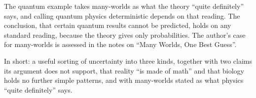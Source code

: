 \begin{afterword}
The quantum example takes many-worlds as what the theory ``quite definitely'' says, and calling quantum physics deterministic depends on that reading. The conclusion, that certain quantum results cannot be predicted, holds on any standard reading, because the theory gives only probabilities. The author's case for many-worlds is assessed in the notes on ``Many Worlds, One Best Guess''.

In short: a useful sorting of uncertainty into three kinds, together with two claims its argument does not support, that reality ``is made of math'' and that biology holds no further simple patterns, and with many-worlds stated as what physics ``quite definitely'' says.
\end{afterword}
